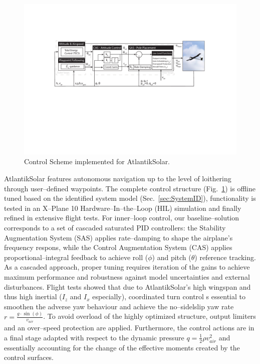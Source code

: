 
\begin{figure}[tb]
    \centering
     \includegraphics[width=\linewidth]{images/11_ControlScheme/ControlScheme.pdf}
    \caption{Control Scheme implemented for AtlantikSolar.}
    \label{fig:ControlScheme}
\end{figure}

AtlantikSolar features autonomous navigation up to the level of loithering through user--defined waypoints. The complete control structure (Fig.~\ref{fig:ControlScheme}) is offline tuned based on the identified system model (Sec.~\ref{sec:SystemID}), functionality is tested in an X--Plane 10 Hardware--In--the--Loop (HIL) simulation and finally refined in extensive flight tests. For inner--loop control, our baseline--solution corresponds to a set of cascaded saturated PID controllers: the Stability Augmentation System (SAS) applies rate--damping to shape the airplane's frequency respons, while the Control Augmentation System (CAS) applies proportional--integral feedback to achieve roll ($\phi$) and pitch ($\theta$) reference tracking. As a cascaded approach, proper tuning requires iteration of the gains to achieve maximum performance and robustness against model uncertainties and external disturbances. Flight tests showed that due to AtlantikSolar's high wingspan and thus high inertial ($I_z$ and $I_x$ especially), coordinated turn control s essential to smoothen the adverse yaw behaviour and achieve the no--sidelslip yaw rate $r=\frac{g\cdot \sin(\phi)}{v_{air}}$. To avoid overload of the highly optimized structure, output limiters and an over--speed protection are applied. Furthermore, the control actions are in a final stage adapted with respect to the dynamic pressure $q=\frac{1}{2}\rho v^{2}_{air}$ and essentially accounting for the change of the effective moments created by the control surfaces. 

